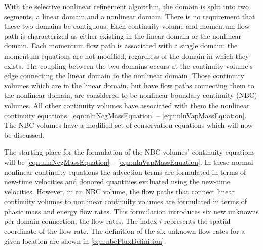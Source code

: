 With the selective nonlinear refinement algorithm, the domain is split into two segments, a linear domain and a nonlinear domain.
There is no requirement that these two domains be contiguous.
Each continuity volume and momentum flow path is characterized as either existing in the linear domain or the nonlinear domain.
Each momentum flow path is associated with a single domain; the momentum equations are not modified, regardless of the domain in which they exists.
The coupling between the two domains occurs at the continuity volume's edge connecting the linear domain  to the nonlinear domain.
Those continuity volumes which are in the linear domain, but have flow paths connecting them to the nonlinear domain, are considered to be nonlinear boundary continuity (NBC) volumes.
All other continuity volumes have associated with them the nonlinear continuity equations, \eqref{eqn:nlnNcgMassEquation} -- \eqref{eqn:nlnVapMassEquation}.
The NBC volumes have a modified set of conservation equations which will now be discussed.

The starting place for the formulation of the NBC volumes' continuity equations will be \eqref{eqn:nlnNcgMassEquation} -- \eqref{eqn:nlnVapMassEquation}.
In these normal nonlinear continuity equations the advection terms are formulated in terms of new-time velocities and donored quantities evaluated using the new-time velocities.
However, in an NBC volume, the flow paths that connect linear continuity volumes to nonlinear continuity volumes are formulated in terms of phasic mass and energy flow rates.
This formulation introduces six new unknowns per domain connection, the flow rates.
The index $i$ represents the spatial coordinate of the flow rate.
The definition of the six unknown flow rates for a given location are shown in \eqref{eqn:nbcFluxDefinition}.


